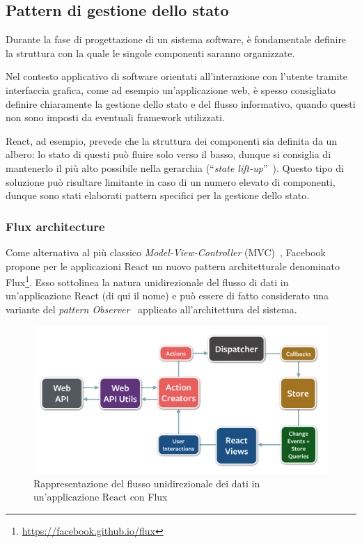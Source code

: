\subsection{Pattern di gestione dello stato}
Durante la fase di progettazione di un sistema software, è fondamentale definire la struttura con la quale le singole componenti saranno organizzate.

Nel contesto applicativo di software orientati all'interazione con l'utente tramite interfaccia grafica, come ad esempio un'applicazione web,
è spesso consigliato definire chiaramente la gestione dello stato e del flusso informativo, quando questi non sono imposti da eventuali framework utilizzati.

React, ad esempio, prevede che la struttura dei componenti sia definita da un albero:
lo stato di questi può fluire solo verso il basso, dunque si consiglia di mantenerlo il più alto possibile nella gerarchia (``\emph{state lift-up}''~\cite{react-docs}).
Questo tipo di soluzione può risultare limitante in caso di un numero elevato di componenti, dunque sono stati elaborati pattern specifici per la gestione dello stato.

\subsubsection{Flux architecture}
Come alternativa al più classico \emph{Model-View-Controller} (MVC)~\cite{Reenskaug2003TheM},
Facebook propone per le applicazioni React un nuovo pattern architetturale denominato Flux\footnote{\url{https://facebook.github.io/flux}}.
Esso sottolinea la natura unidirezionale del flusso di dati in un'applicazione React (di qui il nome)
e può essere di fatto considerato una variante del \emph{pattern Observer}~\cite{10.5555/186897} applicato all'architettura del sistema.

\begin{figure}[htbp]
  \centering
  \includegraphics[width=\linewidth]{res/fig/flux-diagram-white-background.png}
  \caption{Rappresentazione del flusso unidirezionale dei dati in un'applicazione React con Flux}%
  \label{fig:flux}
\end{figure}

